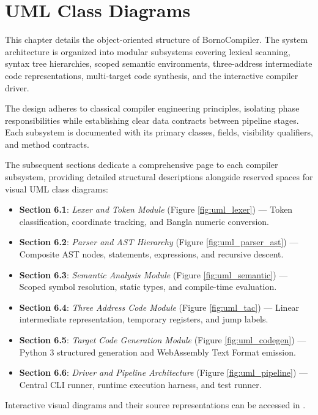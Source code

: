 \documentclass[12pt, a4paper]{report}
\begin{document}
\chapter{UML Class Diagrams}

This chapter details the object-oriented structure of BornoCompiler. The system architecture is organized into modular subsystems covering lexical scanning, syntax tree hierarchies, scoped semantic environments, three-address intermediate code representations, multi-target code synthesis, and the interactive compiler driver.

The design adheres to classical compiler engineering principles, isolating phase responsibilities while establishing clear data contracts between pipeline stages. Each subsystem is documented with its primary classes, fields, visibility qualifiers, and method contracts.

The subsequent sections dedicate a comprehensive page to each compiler subsystem, providing detailed structural descriptions alongside reserved spaces for visual UML class diagrams:
\begin{itemize}
    \item \textbf{Section 6.1}: \textit{Lexer and Token Module} (Figure \ref{fig:uml_lexer}) --- Token classification, coordinate tracking, and Bangla numeric conversion.
    \item \textbf{Section 6.2}: \textit{Parser and AST Hierarchy} (Figure \ref{fig:uml_parser_ast}) --- Composite AST nodes, statements, expressions, and recursive descent.
    \item \textbf{Section 6.3}: \textit{Semantic Analysis Module} (Figure \ref{fig:uml_semantic}) --- Scoped symbol resolution, static types, and compile-time evaluation.
    \item \textbf{Section 6.4}: \textit{Three Address Code Module} (Figure \ref{fig:uml_tac}) --- Linear intermediate representation, temporary registers, and jump labels.
    \item \textbf{Section 6.5}: \textit{Target Code Generation Module} (Figure \ref{fig:uml_codegen}) --- Python 3 structured generation and WebAssembly Text Format emission.
    \item \textbf{Section 6.6}: \textit{Driver and Pipeline Architecture} (Figure \ref{fig:uml_pipeline}) --- Central CLI runner, runtime execution harness, and test runner.
\end{itemize}

Interactive visual diagrams and their source representations can be accessed in .
\end{document}

